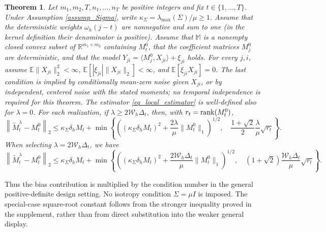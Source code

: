 \documentclass[12pt]{article}
\newtheorem{thm}{Theorem}
\def\rank{\mathop{\rm rank}}
\begin{document}
  \begin{thm}
  \label{thm_error_bound}
  Let $m_1,m_2,T,n_1,\ldots,n_T$ be positive integers and fix
  $t\in\{1,\ldots,T\}$. Under Assumption \ref{assump_Sigma}, write
  $\kappa_\Sigma=\lambda_{\max}(\Sigma)/\mu\ge1$.
  Assume that the deterministic weights $\omega_h(j-t)$ are nonnegative
  and sum to one (in the kernel definition their denominator is positive).
  Assume that $\mathbb M$ is a nonempty closed convex subset of
  $\mathbb R^{m_1\times m_2}$ containing $M_t^0$, that the coefficient
  matrices $M_j^0$ are deterministic, and that the model
  $Y_{ji}=\langle M_j^0,X_{ji}\rangle+\xi_{ji}$ holds.
  For every $j,i$, assume
  $\mathbb E\|X_{ji}\|_2^2<\infty$,
  $\mathbb E[|\xi_{ji}|\|X_{ji}\|_2]<\infty$, and
  $\mathbb E[\xi_{ji}X_{ji}]=0$.
  The last condition is implied by conditionally mean-zero noise given
  $X_{ji}$, or by independent, centered noise with the stated moments;
  no temporal independence is required for this theorem.
  The estimator \eqref{eq_local_estimator} is well-defined also for
  $\lambda=0$. For each realization, if
  $\lambda\ge2\mathcal W_h\Delta_t$, then, with $r_t=\rank(M_t^0)$,
  \begin{equation}
   \label{eq_thm_error_bound}
  \left\|\widetilde M_t^\lambda-M_t^0\right\|_2
  \le \kappa_\Sigma\delta_hM_t+
  \min\left\{
    \left((\kappa_\Sigma\delta_hM_t)^2+
      \frac{2\lambda}{\mu}\|M_t^0\|_1\right)^{1/2},\quad
    \frac{1+\sqrt2}{2}\frac{\lambda}{\mu}\sqrt{r_t}
  \right\}.
  \end{equation}
  When selecting $\lambda=2\mathcal W_h\Delta_t$, we have
  \begin{equation}
  \label{proposed_bound}
  \left\|\widetilde M_t^\lambda-M_t^0\right\|_2
  \le \kappa_\Sigma\delta_hM_t+
  \min\left\{
    \left((\kappa_\Sigma\delta_hM_t)^2+
      \frac{2\mathcal W_h\Delta_t}{\mu}\|M_t^0\|_1\right)^{1/2},\quad
    (1+\sqrt2)\frac{\mathcal W_h\Delta_t}{\mu}\sqrt{r_t}
  \right\}.
  \end{equation}
  \end{thm}

  Thus the bias contribution is multiplied by the condition number in
  the general positive-definite design setting. No isotropy condition
  $\Sigma=\mu I$ is imposed. The special-case square-root constant follows
  from the stronger inequality proved in the supplement, rather than
  from direct substitution into the weaker general display.
\end{document}
